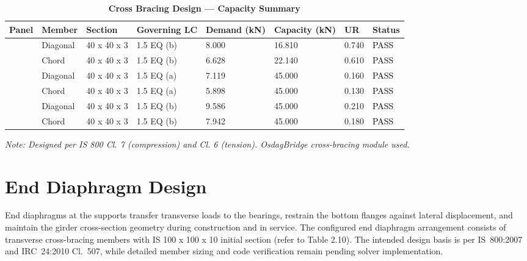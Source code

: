 \documentclass[12pt,a4paper]{report}
\numberwithin{table}{chapter}
\numberwithin{figure}{chapter}
\begin{document}
\vspace{1em}
\begin{longtable}{|C{2.0cm}|L{1.8cm}|C{2.2cm}|C{3.0cm}|C{1.8cm}|C{1.8cm}|C{1.2cm}|C{1.8cm}|}
\caption{\textbf{Cross Bracing Design --- Capacity Summary}}\\
\hline
\textbf{Panel} & \textbf{Member} & \textbf{Section} & \textbf{Governing LC} & \textbf{Demand (kN)} & \textbf{Capacity (kN)} & \textbf{UR} & \textbf{Status} \\[6pt]
\hline
{} & Diagonal & 40 x 40 x 3 & 1.5 EQ (b) & 8.000 & 16.810 & 0.740 & \textcolor{black}{PASS} \\[6pt]
 & Chord & 40 x 40 x 3 & 1.5 EQ (b) & 6.628 & 22.140 & 0.610 & \textcolor{black}{PASS} \\[6pt]
\hline
{} & Diagonal & 40 x 40 x 3 & 1.5 EQ (a) & 7.119 & 45.000 & 0.160 & \textcolor{black}{PASS} \\[6pt]
 & Chord & 40 x 40 x 3 & 1.5 EQ (a) & 5.898 & 45.000 & 0.130 & \textcolor{black}{PASS} \\[6pt]
\hline
{} & Diagonal & 40 x 40 x 3 & 1.5 EQ (b) & 9.586 & 45.000 & 0.210 & \textcolor{black}{PASS} \\[6pt]
 & Chord & 40 x 40 x 3 & 1.5 EQ (b) & 7.942 & 45.000 & 0.180 & \textcolor{black}{PASS} \\[6pt]
\hline
\end{longtable}
\noindent\textit{Note: Designed per IS 800 Cl. 7 (compression) and Cl. 6 (tension). OsdagBridge cross-bracing module used.}

\section{End Diaphragm Design}
\label{sec:end-diaphragm}

End diaphragms at the supports transfer transverse loads to the bearings, restrain the bottom flanges against lateral displacement, and maintain the girder cross-section geometry during construction and in service. The configured end diaphragm arrangement consists of transverse cross-bracing members with IS 100 x 100 x 10 initial section (refer to Table 2.10). The intended design basis is per IS~800:2007 and IRC~24:2010 Cl.~507, while detailed member sizing and code verification remain pending solver implementation.
\end{document}
